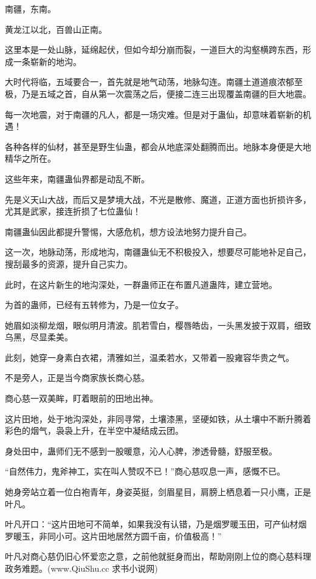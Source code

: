 
\begin{this_body}

南疆，东南。

黄龙江以北，百兽山正南。

这里本是一处山脉，延绵起伏，但如今却分崩而裂，一道巨大的沟壑横跨东西，形成一条崭新的地沟。

大时代将临，五域要合一，首先就是地气动荡，地脉勾连。南疆土道道痕浓郁至极，乃是五域之首，自从第一次震荡之后，便接二连三出现覆盖南疆的巨大地震。

每一次地震，对于南疆的凡人，都是一场灾难。但是对于蛊仙，却意味着崭新的机遇！

各种各样的仙材，甚至是野生仙蛊，都会从地底深处翻腾而出。地脉本身便是大地精华之所在。

这些年来，南疆蛊仙界都是动乱不断。

先是义天山大战，而后又是梦境大战，不光是散修、魔道，正道方面也折损许多，尤其是武家，接连折损了七位蛊仙！

南疆蛊仙因此都提升警惕，大感危机，想方设法地努力提升自己。

这一次，地脉动荡，形成地沟，南疆蛊仙无不积极投入，想要尽可能地补足自己，搜刮最多的资源，提升自己实力。

此时，在这片新生的地沟深处，一群蛊师正在布置凡道蛊阵，建立营地。

为首的蛊师，已经有五转修为，乃是一位女子。

她眉如淡柳龙烟，眼似明月清波。肌若雪白，樱唇皓齿，一头黑发披于双肩，细致乌黑，尽显柔美。

此刻，她穿一身素白衣裙，清雅如兰，温柔若水，又带着一股雍容华贵之气。

不是旁人，正是当今商家族长商心慈。

商心慈一双美眸，盯着眼前的田地出神。

这片田地，处于地沟深处，非同寻常，土壤漆黑，坚硬如铁，从土壤中不断升腾着彩色的烟气，袅袅上升，在半空中凝结成云团。

身处田中，蛊师们无不感到一股暖意，沁人心脾，渗透骨髓，舒服至极。

“自然伟力，鬼斧神工，实在叫人赞叹不已！”商心慈叹息一声，感慨不已。

她身旁站立着一位白袍青年，身姿英挺，剑眉星目，肩膀上栖息着一只小鹰，正是叶凡。

叶凡开口：“这片田地可不简单，如果我没有认错，乃是烟罗暖玉田，可产仙材烟罗暖玉，非同小可。这片田地居然方圆千亩，价值极高！”

叶凡对商心慈仍旧心怀爱恋之意，之前他就挺身而出，帮助刚刚上位的商心慈料理政务难题。(www.QiuShu.cc 求书小说网)


\end{this_body}
